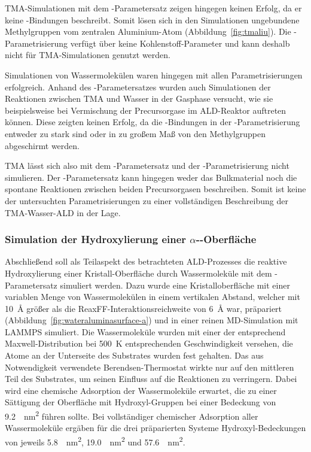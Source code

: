 TMA-Simulationen mit dem -Parametersatz zeigen hingegen keinen Erfolg, da er keine -Bindungen beschreibt.
Somit lösen sich in den Simulationen ungebundene Methylgruppen vom zentralen Aluminium-Atom (Abbildung~\ref{fig:tmaliu}).
Die -Parametrisierung verfügt über keine Kohlenstoff-Parameter und kann deshalb nicht für TMA-Simulationen genutzt werden.

Simulationen von Wassermolekülen waren hingegen mit allen Parametrisierungen erfolgreich.
Anhand des -Parametersatzes wurden auch Simulationen der Reaktionen zwischen TMA und Wasser in der Gasphase versucht, wie sie beispielsweise bei Vermischung der Precursorgase im ALD-Reaktor auftreten können.
Diese zeigten keinen Erfolg, da die -Bindungen in der -Parametrisierung entweder zu stark sind oder in zu großem Maß von den Methylgruppen abgeschirmt werden.

TMA lässt sich also mit dem -Parametersatz und der -Parametrisierung nicht simulieren.
Der -Parametersatz kann hingegen weder das Bulkmaterial noch die spontane Reaktionen zwischen beiden Precursorgasen beschreiben.
Somit ist keine der untersuchten Parametrisierungen zu einer vollständigen Beschreibung der TMA-Wasser-ALD in der Lage.

\subsubsection{Simulation der Hydroxylierung einer \texorpdfstring{$\alpha$-}{alpha-Al2O3}-Oberfläche}

Abschließend soll als Teilaspekt des betrachteten ALD-Prozesses die reaktive Hydroxylierung einer Kristall-Oberfläche durch Wassermoleküle mit dem -Parametersatz simuliert werden.
Dazu wurde eine Kristalloberfläche mit einer variablen Menge von Wassermolekülen in einem vertikalen Abstand, welcher mit \SI{10}{\angstrom} größer als die ReaxFF-Inter\-aktions\-reich\-weite von \SI{6}{\angstrom} war, präpariert (Abbildung~\ref{fig:wateraluminasurface-a}) und in einer reinen MD-Simulation mit LAMMPS simuliert.
Die Wassermoleküle wurden mit einer der entsprechend Maxwell-Distribution bei \SI{500}{\kelvin} entsprechenden Geschwindigkeit versehen, die Atome an der Unterseite des Substrates wurden fest gehalten.
Das aus Notwendigkeit verwendete Berendsen-Thermostat wirkte nur auf den mittleren Teil des Substrates, um seinen Einfluss auf die Reaktionen zu verringern.
Dabei wird eine chemische Adsorption der Wassermoleküle erwartet\cite{shapovalov_ab_2000}, die zu einer Sättigung der Oberfläche mit Hydroxyl-Gruppen bei einer Bedeckung von \SI{9.2}{\per\square\nano\meter}\cite{kim_energy_2011} führen sollte.
Bei vollständiger chemischer Adsorption aller Wassermoleküle ergäben für die drei präparierten Systeme Hydroxyl-Bedeckungen von jeweils \SI{5.8}{\per\square\nano\meter}, \SI{19.0}{\per\square\nano\meter} und \SI{57.6}{\per\square\nano\meter}.

